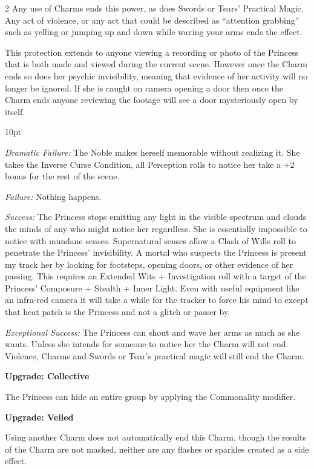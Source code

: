 \begin{multicols}{2}
Any use of Charms ends this power, as does Swords or Tears' Practical Magic. Any act of violence, or any act that could be described as \textquotedblleft attention grabbing\textquotedblright\, such as yelling or jumping up and down while waving your arms ends the effect. 

This protection extends to anyone viewing a recording or photo of the Princess that is both made and viewed during the current scene. However once the Charm ends so does her psychic invisibility, meaning that evidence of her activity will no longer be ignored. If she is caught on camera opening a door then once the Charm ends anyone reviewing the footage will see a door mysteriously open by itself. 

\begin{myindentpar}{10pt}

\emph{Dramatic Failure:} The Noble makes herself memorable without realizing it. She takes the Inverse Curse Condition, all Perception rolls to notice her take a +2 bonus for the rest of the scene.

\emph{Failure:} Nothing happens. 

\emph{Success:} The Princess stops emitting any light in the visible spectrum and clouds the minds of any who might notice her regardless. She is essentially impossible to notice with mundane senses. Supernatural senses allow a Clash of Wills roll to penetrate the Princess' invisibility. A mortal who suspects the Princess is present my track her by looking for footsteps, opening doors, or other evidence of her passing. This requires an Extended Wits + Investigation roll with a target of the Princess' Composure + Stealth + Inner Light. Even with useful equipment like an infra-red camera it will take a while for the tracker to force his mind to except that heat patch is the Princess and not a glitch or passer by. 

\emph{Exceptional Success:} The Princess can shout and wave her arms as much as she wants. Unless she intends for someone to notice her the Charm will not end. Violence, Charms and Swords or Tear's practical magic will still end the Charm. 

\textbf{Upgrade: Collective}

The Princess can hide an entire group by applying the Commonality modifier. 

\textbf{Upgrade: Veiled}

Using another Charm does not automatically end this Charm, though the results of the Charm are not masked, neither are any flashes or sparkles created as a side effect.


\end{myindentpar}
\end{multicols}
